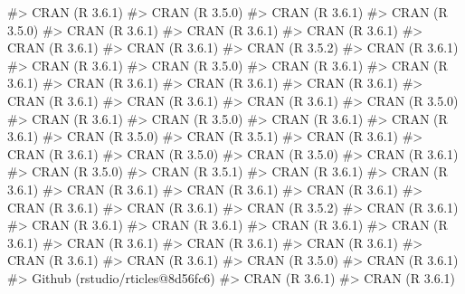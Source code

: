 \documentclass[
]{jss}
\begin{document}
\begin{CodeChunk}
\begin{CodeOutput}
#>  CRAN (R 3.6.1)                          
#>  CRAN (R 3.5.0)                          
#>  CRAN (R 3.6.1)                          
#>  CRAN (R 3.5.0)                          
#>  CRAN (R 3.6.1)                          
#>  CRAN (R 3.6.1)                          
#>  CRAN (R 3.6.1)                          
#>  CRAN (R 3.6.1)                          
#>  CRAN (R 3.6.1)                          
#>  CRAN (R 3.5.2)                          
#>  CRAN (R 3.6.1)                          
#>  CRAN (R 3.6.1)                          
#>  CRAN (R 3.5.0)                          
#>  CRAN (R 3.6.1)                          
#>  CRAN (R 3.6.1)                          
#>  CRAN (R 3.6.1)                          
#>  CRAN (R 3.6.1)                          
#>  CRAN (R 3.6.1)                          
#>  CRAN (R 3.6.1)                          
#>  CRAN (R 3.6.1)                          
#>  CRAN (R 3.6.1)                          
#>  CRAN (R 3.5.0)                          
#>  CRAN (R 3.6.1)                          
#>  CRAN (R 3.5.0)                          
#>  CRAN (R 3.6.1)                          
#>  CRAN (R 3.6.1)                          
#>  CRAN (R 3.5.0)                          
#>  CRAN (R 3.5.1)                          
#>  CRAN (R 3.6.1)                          
#>  CRAN (R 3.6.1)                          
#>  CRAN (R 3.5.0)                          
#>  CRAN (R 3.5.0)                          
#>  CRAN (R 3.6.1)                          
#>  CRAN (R 3.5.0)                          
#>  CRAN (R 3.5.1)                          
#>  CRAN (R 3.6.1)                          
#>  CRAN (R 3.6.1)                          
#>  CRAN (R 3.6.1)                          
#>  CRAN (R 3.6.1)                          
#>  CRAN (R 3.6.1)                          
#>  CRAN (R 3.6.1)                          
#>  CRAN (R 3.6.1)                          
#>  CRAN (R 3.5.2)                          
#>  CRAN (R 3.6.1)                          
#>  CRAN (R 3.6.1)                          
#>  CRAN (R 3.6.1)                          
#>  CRAN (R 3.6.1)                          
#>  CRAN (R 3.6.1)                          
#>  CRAN (R 3.6.1)                          
#>  CRAN (R 3.6.1)                          
#>  CRAN (R 3.6.1)                          
#>  CRAN (R 3.6.1)                          
#>  CRAN (R 3.6.1)                          
#>  CRAN (R 3.5.0)                          
#>  CRAN (R 3.6.1)                          
#>  Github (rstudio/rticles@8d56fc6)        
#>  CRAN (R 3.6.1)                          
#>  CRAN (R 3.6.1)                          

\end{CodeOutput}
\end{CodeChunk}
\end{document}
